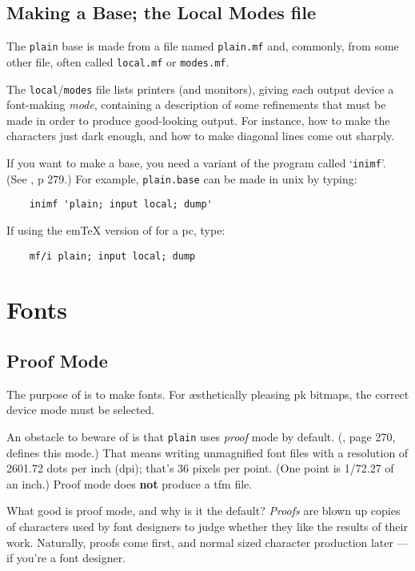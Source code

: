 \subsection{Making a Base; the Local Modes file}\label{sub:modes}

The {\tt plain} base is made from a \MF{} file named
{\tt plain.mf} and, commonly, from some other file, often called
{\tt local.mf} or {\tt modes.mf}.

The {\tt local}/{\tt modes} file lists printers (and monitors), giving
each output device a font-making {\em mode\/}, containing a
description of some refinements that must be made in order to produce
good-looking output.  For instance, how to make the characters just
dark enough, and how to make diagonal lines come out sharply.

If you want to make a base, you need a variant of the \MF{} program
called `{\tt inimf}'.  (See \MFbook{}, p 279.)  For example,
{\tt plain.base} can be made in {\sc unix} by typing:
\begin{verbatim}
    inimf 'plain; input local; dump'
\end{verbatim}
If using the em\TeX{} version of \MF{} for a {\sc pc}, type:
\begin{verbatim}
    mf/i plain; input local; dump
\end{verbatim}


\section{Fonts}\label{sec:fonts}


\subsection{Proof Mode}\label{sub:proof}

The purpose of \MF{} is to make fonts.  For \ae{}sthetically pleasing
{\sc pk} bitmaps, the correct device mode must be selected.

An obstacle to beware of is that {\tt plain} \MF{} uses
{\em proof\/} mode by default.
(\MFbook{}, page 270, defines this mode.)
That means writing unmagnified font files with a resolution of
2601.72 dots per inch (dpi); that's 36 pixels per point.  (One
point is 1/72.27 of an inch.)  Proof mode does {\bf not} produce a
{\sc tfm} file.

What good is proof mode, and why is it the default?
{\em Proofs\/} are blown up copies of characters used by font
designers to judge whether they like the results of their work.
Naturally, proofs come first, and normal sized character production
later --- if you're a font designer.

